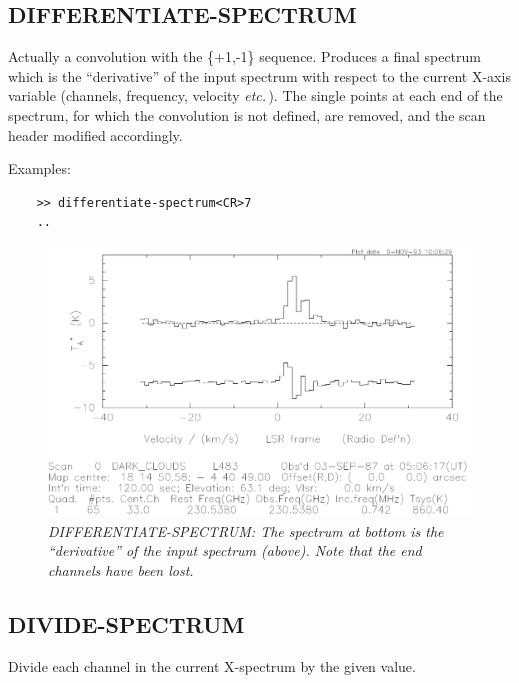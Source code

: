 \documentclass[11pt,twoside]{report}
\newcommand{\etc}{{\it etc.\,}}
\begin{document}
\subsection{DIFFERENTIATE-SPECTRUM} 

Actually a convolution with the \{+1,-1\} sequence. Produces a final spectrum
which is the ``derivative'' of the input spectrum with respect to the
current X-axis variable (channels, frequency, velocity \etc). The single points
at each end of the spectrum, for which the convolution is not defined, are
removed, and the scan header modified accordingly.

Examples:
\begin{verbatim}
    >> differentiate-spectrum<CR>7
    ..
\end{verbatim}

\begin{figure}[htbp]
\begin{center}
\includegraphics[scale=0.65]{diff}
\protect\parbox{5.5in}
{\caption[DIFF]
{\sl
DIFFERENTIATE-SPECTRUM: The spectrum at bottom is the ``derivative'' of the
input spectrum (above). Note that the end channels have been lost.
\label{DIFF}
}
}
\end{center}
\end{figure}

\subsection{DIVIDE-SPECTRUM} 

Divide each channel in the current X-spectrum by the given value.
\end{document}
